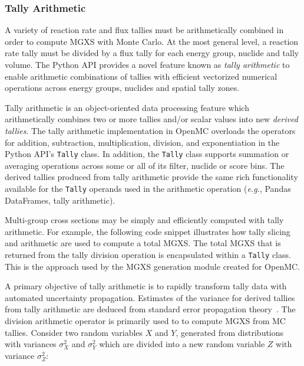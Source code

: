 \subsubsection{Tally Arithmetic}
\label{subsubsec:tally-arithmetic}

A variety of reaction rate and flux tallies must be arithmetically combined in order to compute MGXS with Monte Carlo. At the most general level, a reaction rate tally must be divided by a flux tally for each energy group, nuclide and tally volume. The Python API provides a novel feature known as \textit{tally arithmetic} to enable arithmetic combinations of tallies with efficient vectorized numerical operations across energy groups, nuclides and spatial tally zones.

Tally arithmetic is an object-oriented data processing feature which arithmetically combines two or more tallies and/or scalar values into new \textit{derived tallies}. The tally arithmetic implementation in OpenMC overloads the operators for addition, subtraction, multiplication, division, and exponentiation in the Python API's \texttt{Tally} class. In addition, the \texttt{Tally} class supports summation or averaging operations across some or all of its filter, nuclide or score bins. The derived tallies produced from tally arithmetic provide the same rich functionality available for the \texttt{Tally} operands used in the arithmetic operation (\textit{e.g.}, Pandas DataFrames, tally arithmetic).

Multi-group cross sections may be simply and efficiently computed with tally arithmetic. For example, the following code snippet illustrates how tally slicing and arithmetic are used to compute a total MGXS. The total MGXS that is returned from the tally division operation is encapsulated within a \texttt{Tally} class. This is the approach used by the MGXS generation module created for OpenMC.



A primary objective of tally arithmetic is to rapidly transform tally data with automated uncertainty propagation. Estimates of the variance for derived tallies from tally arithmetic are deduced from standard error propagation theory~\cite{bevington2003data}. The division arithmetic operator is primarily used to to compute MGXS from MC tallies. Consider two random variables $X$ and $Y$, generated from distributions with variances $\sigma_{X}^2$ and $\sigma_{Y}^2$ which are divided into a new random variable $Z$ with variance $\sigma_{Z}^2$:

